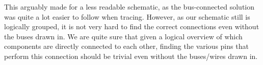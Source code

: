 This arguably made for a less readable schematic, as the bus-connected solution
was quite a lot easier to follow when tracing. However, as our schematic still
is logically grouped, it is not very hard to find the correct connections even
without the buses drawn in. We are quite sure that given a logical overview of
which components are directly connected to each other, finding the various pins
that perform this connection should be trivial even without the buses/wires
drawn in.

